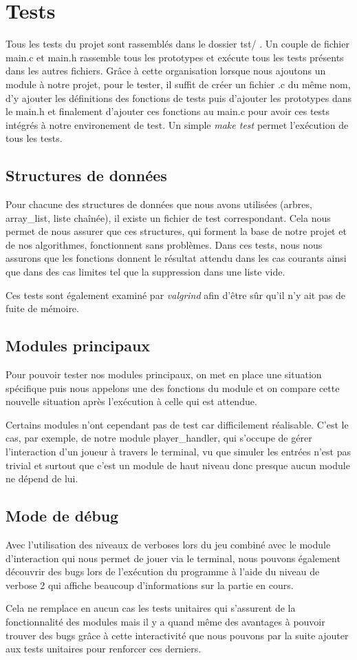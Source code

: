 \section{Tests}

Tous les tests du projet sont rassemblés dans le dossier tst/ . Un couple de fichier main.c et main.h 
rassemble tous les prototypes et exécute tous les tests présents dans les autres fichiers. Grâce à cette
organisation lorsque nous ajoutons un module à notre projet, pour le tester, il suffit de créer un fichier .c
du même nom, d'y ajouter les définitions des fonctions de tests puis d'ajouter les prototypes dans le main.h et
finalement d'ajouter ces fonctions au main.c pour avoir ces tests intégrés à notre environement de test.
Un simple \emph{make test} permet l'exécution de tous les tests. 

\subsection{Structures de données}
Pour chacune des structures de données que nous avons utilisées (arbres, array\_list, liste chaînée),
il existe un fichier de test correspondant. Cela nous permet de nous assurer que ces structures, qui
forment la base de notre projet et de nos algorithmes, fonctionnent sans problèmes. Dans ces tests, nous nous assurons que les fonctions
donnent le résultat attendu dans les cas courants ainsi que dans des cas limites tel que la suppression 
dans une liste vide. 

Ces tests sont également examiné par \emph{valgrind} afin d'être sûr qu'il n'y ait pas 
de fuite de mémoire.

\subsection{Modules principaux}
Pour pouvoir tester nos modules principaux, on met en place une situation spécifique puis nous appelons une des 
fonctions du module et on compare cette nouvelle situation après l'exécution à celle qui est attendue.

Certains modules n'ont cependant pas de test car difficilement réalisable. C'est le cas, par exemple, de notre
module player\_handler, qui s'occupe de gérer l'interaction d'un joueur à travers le terminal, vu que simuler
les entrées n'est pas trivial et surtout que c'est un module de haut niveau donc presque aucun module ne dépend de lui.

\subsection{Mode de débug}
Avec l'utilisation des niveaux de verboses lors du jeu combiné avec le module d'interaction qui nous permet de jouer via le terminal,
nous pouvons également découvrir des bugs lors de l'exécution du programme à l'aide du niveau de verbose 2
qui affiche beaucoup d'informations sur la partie en cours.
   
Cela ne remplace en aucun cas les tests unitaires qui s'assurent de la fonctionnalité des modules mais 
il y a quand même des avantages à pouvoir trouver des bugs grâce à cette interactivité que nous pouvons
par la suite ajouter aux tests unitaires pour renforcer ces derniers. 

